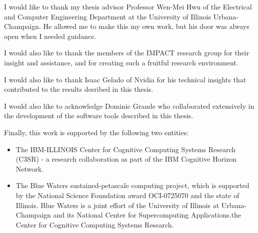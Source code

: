 I would like to thank my thesis advisor Professor Wen-Mei Hwu of the Electrical and Computer Engineering Department at the University of Illinois Urbana-Champaign.
He allowed me to make this my own work, but his door was always open when I needed guidance.

I would also like to thank the members of the IMPACT research group for their insight and assistance, and for creating such a fruitful research environment.

I would also like to thank Isaac Gelado of Nvidia for his technical insights that contributed to the results desribed in this thesis.

I would also like to acknowledge Dominic Grande who collaborated extensively in the development of the software tools described in this thesis.

Finally, this work is supported by the following two entities:
\begin{itemize}
    \item The IBM-ILLINOIS Center for Cognitive Computing Systems Research (C3SR) - a research collaboration as part of the IBM Cognitive Horizon Network.
    \item The Blue Waters sustained-petascale computing project, which is supported by the National Science Foundation award OCI-0725070 and the state of Illinois. 
Blue Waters is a joint effort of the University of Illinois at Urbana-Champaign and its National Center for Supercomputing Applications.the Center for Cognitive Computing Systems Research.
\end{itemize}